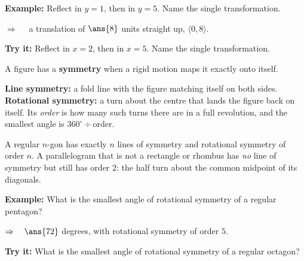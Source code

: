 \documentclass[12pt]{article}
\begin{document}
\begin{examplebox}
\textbf{Example:} \quad Reflect in $y = 1$, then in $y = 5$. Name the single transformation.

$\Rightarrow\quad$ a translation of $\ans{8}$ units straight up, $\langle 0, 8 \rangle$.
\end{examplebox}

\begin{tryitbox}
\textbf{Try it:} \quad Reflect in $x = 2$, then in $x = 5$. Name the single
transformation.\\[2pt]
\end{tryitbox}


\begin{formulabox}
A figure has a \textbf{symmetry} when a rigid motion maps it exactly onto itself.\par
\smallskip
\textbf{Line symmetry:} a fold line with the figure matching itself on both sides.
\textbf{Rotational symmetry:} a turn about the centre that lands the figure back on itself. Its
\emph{order} is how many such turns there are in a full revolution, and the smallest angle is
$360^\circ \div \text{order}$.\par
\smallskip
A regular $n$-gon has exactly $n$ lines of symmetry and rotational symmetry of order $n$. A
parallelogram that is not a rectangle or rhombus has \emph{no} line of symmetry but still has
order $2$: the half turn about the common midpoint of its diagonals.
\end{formulabox}

\begin{examplebox}
\textbf{Example:} \quad What is the smallest angle of rotational symmetry of a regular
pentagon?

$\Rightarrow\quad \ans{72}$ degrees, with rotational symmetry of order $5$.
\end{examplebox}

\begin{tryitbox}
\textbf{Try it:} \quad What is the smallest angle of rotational symmetry of a regular
octagon?\\[2pt]
\end{tryitbox}
\end{document}
